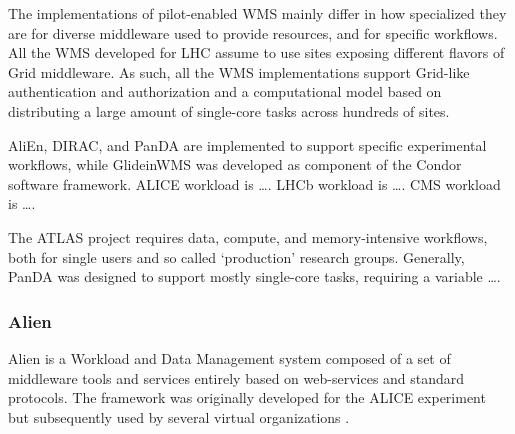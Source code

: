 The implementations of pilot-enabled WMS mainly differ in how specialized they
are for diverse middleware used to provide resources, and for specific
workflows. All the WMS developed for LHC assume to use sites exposing different
flavors of Grid middleware. As such, all the WMS implementations support
Grid-like authentication and authorization and a computational model based on
distributing a large amount of single-core tasks across hundreds of
sites.


AliEn, DIRAC, and PanDA are implemented to support specific experimental
workflows, while GlideinWMS was developed as component of the Condor software
framework. ALICE workload is \ldots. LHCb workload is \ldots. CMS workload is
\ldots.

The ATLAS project requires data, compute, and memory-intensive workflows, both
for single users and so called `production' research groups. Generally, PanDA
was designed to support mostly single-core tasks, requiring a variable \ldots.



\subsubsection{Alien}

Alien is a Workload and Data Management system composed of a set of middleware
tools and services entirely based on web-services and standard protocols. The
framework was originally developed for the ALICE experiment~\cite{Alice1995} but
subsequently used by several virtual organizations
\cite{McClatechey2003,GPCALMA}.


